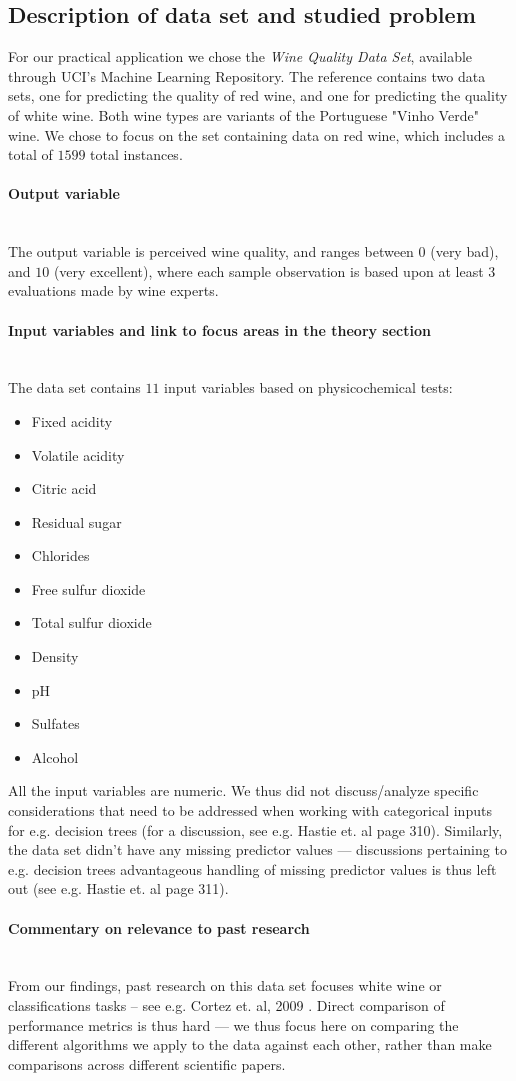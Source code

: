 \documentclass[10pt, a4paper, twocolumn]{article}
\newcommand{\myparagraph}[1]{\paragraph{#1}\mbox{}\\}
\begin{document}
	\subsection{Description of data set and studied problem}
		For our practical application we chose the \emph{Wine Quality Data Set}, available through UCI's Machine Learning Repository\cite{dataset}. The reference contains two data sets, one for predicting the quality of red wine, and one for predicting the quality of white wine. Both wine types are variants of the Portuguese "Vinho Verde" wine. We chose to focus on the set containing data on red wine, which includes a total of $1599$ total instances.
		\myparagraph{Output variable}
			The output variable is perceived wine quality, and ranges between $0$ (very bad), and $10$ (very excellent), where each sample observation is based upon at least $3$ evaluations made by wine experts.
		\myparagraph{Input variables and link to focus areas in the theory section}
			The data set contains $11$ input variables based on physicochemical tests: \begin{itemize}
				\item Fixed acidity
				\item Volatile acidity
				\item Citric acid
				\item Residual sugar
				\item Chlorides
				\item Free sulfur dioxide
				\item Total sulfur dioxide
				\item Density
				\item pH
				\item Sulfates
				\item Alcohol
			\end{itemize}
			All the input variables are numeric. We thus did not discuss/analyze specific considerations that need to be addressed when working with categorical inputs for e.g. decision trees (for a discussion, see e.g. Hastie et. al page 310\cite{ElementsOfStatLearning}). Similarly, the data set didn't have any missing predictor values --- discussions pertaining to e.g. decision trees advantageous handling of missing predictor values is thus left out (see e.g. Hastie et. al page 311\cite{ElementsOfStatLearning}).
		\myparagraph{Commentary on relevance to past research}
			From our findings, past research on this data set focuses white wine or classifications tasks -- see e.g. Cortez et. al, 2009 \cite{winepaper}. Direct comparison of performance metrics is thus hard --- we thus focus here on comparing the different algorithms we apply to the data against each other, rather than make comparisons across different scientific papers.
\end{document}
